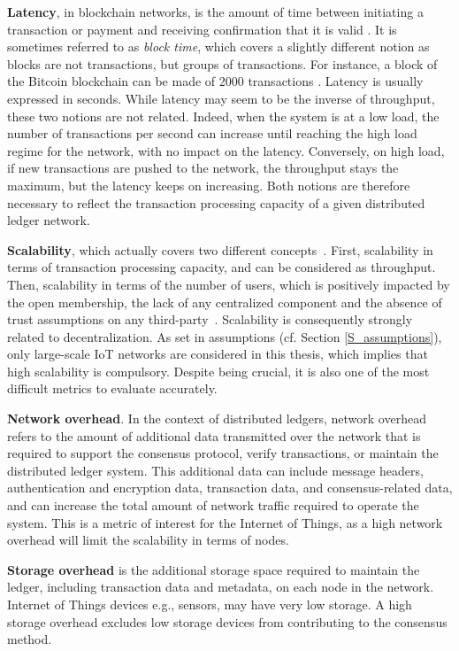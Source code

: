 \textbf{Latency}, in blockchain networks, is the amount of time between initiating a transaction or payment and receiving confirmation that it is valid \cite{Kokoris-Kogias2022}. It is sometimes referred to as \emph{block time}, which covers a slightly different notion as blocks are not transactions, but groups of transactions. For instance, a block of the Bitcoin blockchain can be made of 2000 transactions \cite{nasdaq2023}. Latency is usually expressed in seconds.
While latency may seem to be the inverse of throughput, these two notions are not related. Indeed, when the system is at a low load, the number of transactions per second can increase until reaching the high load regime for the network, with no impact on the latency. Conversely, on high load, if new transactions are pushed to the network, the throughput stays the maximum, but the latency keeps on increasing. Both notions are therefore necessary to reflect the transaction processing capacity of a given distributed ledger network. 

\textbf{Scalability}, which actually covers two different concepts~\cite{Steen2020}. First, scalability in terms of transaction processing capacity, and can be considered as throughput. Then, scalability in terms of the number of users, which is positively impacted by the open membership, the lack of any centralized component and the absence of trust assumptions on any third-party~\cite{Steen2020}. Scalability is consequently strongly related to decentralization. As set in assumptions (cf. Section \ref{S_assumptions}), only large-scale IoT networks are considered in this thesis, which implies that high scalability is compulsory. Despite being crucial, it is also one of the most difficult metrics to evaluate accurately.

\textbf{Network overhead}.
In the context of distributed ledgers, network overhead refers to the amount of additional data transmitted over the network that is required to support the consensus protocol, verify transactions, or maintain the distributed ledger system. This additional data can include message headers, authentication and encryption data, transaction data, and consensus-related data, and can increase the total amount of network traffic required to operate the system. This is a metric of interest for the Internet of Things, as a high network overhead will limit the scalability in terms of nodes.

\textbf{Storage overhead} is the additional storage space required to maintain the ledger, including transaction data and metadata, on each node in the network. Internet of Things devices e.g., sensors, may have very low storage. A high storage overhead excludes low storage devices from contributing to the consensus method.
